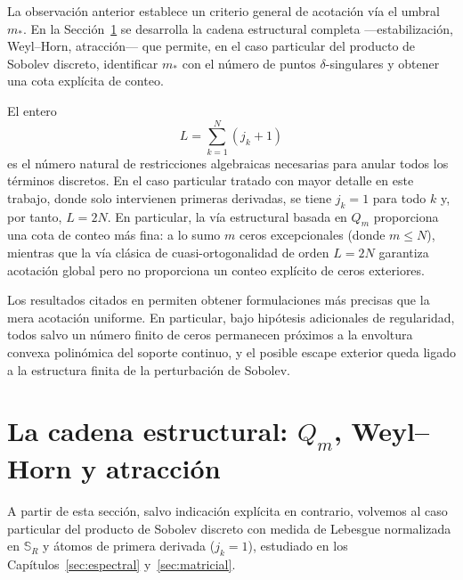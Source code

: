 \begin{rmk}\label{rem:enlace_marco_Qm}
	La observación anterior establece un criterio general de acotación vía el umbral $m_*$. En la Sección~\ref{sec:cadena_Qm} se desarrolla la cadena estructural completa ---estabilización, Weyl--Horn, atracción--- que permite, en el caso particular del producto de Sobolev discreto, identificar $m_*$ con el número de puntos $\delta$-singulares y obtener una cota explícita de conteo.
\end{rmk}

\begin{rmk}
	El entero
	\[
		L = \sum_{k=1}^N (j_k+1)
	\]
	es el número natural de restricciones algebraicas necesarias para anular todos los términos discretos. En el caso particular tratado con mayor detalle en este trabajo, donde solo intervienen primeras derivadas, se tiene $j_k=1$ para todo $k$ y, por tanto, $L=2N$. En particular, la vía estructural basada en $Q_m$ proporciona una cota de conteo más fina: a lo sumo $m$ ceros excepcionales (donde $m \le N$), mientras que la vía clásica de cuasi-ortogonalidad de orden $L=2N$ garantiza acotación global pero no proporciona un conteo explícito de ceros exteriores.
\end{rmk}

\begin{rmk}
	Los resultados citados en \cite{lopez1999zero,lopez2001sobolev,marcellan2015sobolev} permiten obtener formulaciones más precisas que la mera acotación uniforme. En particular, bajo hipótesis adicionales de regularidad, todos salvo un número finito de ceros permanecen próximos a la envoltura convexa polinómica del soporte continuo, y el posible escape exterior queda ligado a la estructura finita de la perturbación de Sobolev.
\end{rmk}

\section{La cadena estructural: \texorpdfstring{$Q_m$}{Q_m}, Weyl--Horn y atracción}\label{sec:cadena_Qm}

\begin{rmk}
	A partir de esta sección, salvo indicación explícita en contrario, volvemos al caso particular del producto de Sobolev discreto con medida de Lebesgue normalizada en $\mathbb{S}_R$ y átomos de primera derivada ($j_k=1$), estudiado en los Capítulos~\ref{sec:espectral} y~\ref{sec:matricial}.
\end{rmk}

